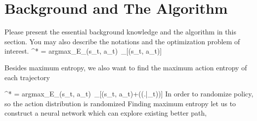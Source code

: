 \section{Background and The Algorithm}
\label{section:algorithm}
Please present the essential background knowledge and the algorithm in this section. You may also describe the notations and the optimization problem of interest.
\pi^* = argmax_\pi E_{(s_t, a_t)~\rho_\pi}[\sumR(s_t, a_t)]

Besides maximum entropy, we also want to find the maximum action entropy of each trajectory

\pi^* = argmax_\pi E_{(s_t, a_t)~\rho_\pi}[\sumR(s_t, a_t)+\alphaH(\pi(.|_t))]
In order to randomize policy, so the action distribution is randomized
Finding maximum entropy let us to construct a neural network which can explore existing better path, 